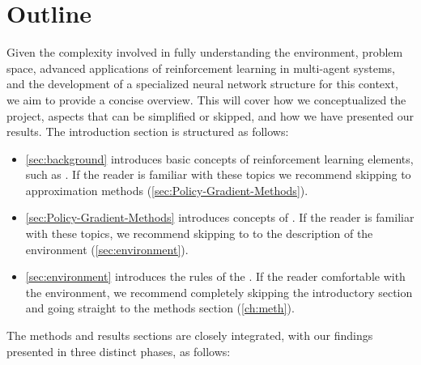\section{Outline}

\noindent Given the complexity involved in fully understanding the environment, problem space, advanced applications of reinforcement learning in multi-agent systems, and the development of a specialized neural network structure for this context, we aim to provide a concise overview. This will cover how we conceptualized the project, aspects that can be simplified or skipped, and how we have presented our results. The introduction section is structured as follows:

\begin{itemize}[itemsep=1pt, parsep=0pt]



\item \autoref{sec:background} introduces basic concepts of reinforcement learning elements, such as . If the reader is familiar with these topics we recommend skipping to approximation methods (\autoref{sec:Policy-Gradient-Methods}).



\item \autoref{sec:Policy-Gradient-Methods} introduces concepts of . If the reader is familiar with these topics, we recommend skipping to to the description of the environment (\autoref{sec:environment}).



\item \autoref{sec:environment} introduces the rules of the . If the reader comfortable with the environment, we recommend completely skipping the introductory section and going straight to the methods section (\autoref{ch:meth}).

\end{itemize}

\noindent The methods and results sections are closely integrated, with our findings presented in three distinct phases, as follows:

